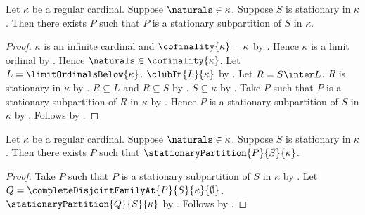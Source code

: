 \begin{theorem}\label{solovay_stationary_subpartition}
    Let $\kappa$ be a regular cardinal.
    Suppose $\naturals\in\kappa$.
    Suppose $S$ is stationary in $\kappa$.
    Then there exists $P$ such that
        $P$ is a stationary subpartition of $S$ in $\kappa$.
\end{theorem}
\begin{proof}
    $\kappa$ is an infinite cardinal and $\cofinality{\kappa}=\kappa$
        by .
    Hence $\kappa$ is a limit ordinal
        by .
    Hence $\naturals\in\cofinality{\kappa}$.
    Let $L=\limitOrdinalsBelow{\kappa}$.
    $\clubIn{L}{\kappa}$ by .
    Let $R=S\inter L$.
    $R$ is stationary in $\kappa$
        by .
    $R\subseteq L$ and $R\subseteq S$ by .
    $S\subseteq\kappa$ by .
    Take $P$ such that $P$ is a stationary subpartition of $R$ in $\kappa$
        by .
    Hence $P$ is a stationary subpartition of $S$ in $\kappa$
        by .
    Follows by \auto.
\end{proof}

\begin{theorem}\label{solovay_stationary_splitting}
    Let $\kappa$ be a regular cardinal.
    Suppose $\naturals\in\kappa$.
    Suppose $S$ is stationary in $\kappa$.
    Then there exists $P$ such that
        $\stationaryPartition{P}{S}{\kappa}$.
\end{theorem}
\begin{proof}
    Take $P$ such that $P$ is a stationary subpartition of $S$ in $\kappa$
        by .
    Let $Q=\completeDisjointFamilyAt{P}{S}{\kappa}{\emptyset}$.
    $\stationaryPartition{Q}{S}{\kappa}$
        by .
    Follows by \auto.
\end{proof}

